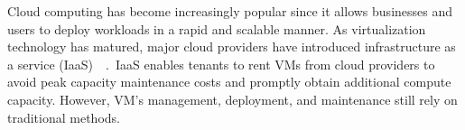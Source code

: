 












Cloud computing has become increasingly popular since it allows businesses and users to deploy workloads in a rapid and scalable manner. As virtualization technology has matured, major cloud providers have introduced infrastructure as a 
service (IaaS)~\cite*{8031522}~\cite*{10.1145/2767181}.~\acrshort{IaaS} enables tenants to rent VMs from cloud providers to avoid peak capacity maintenance costs and promptly obtain additional compute capacity. However, VM's management, deployment, and maintenance still rely on traditional methods.
 
